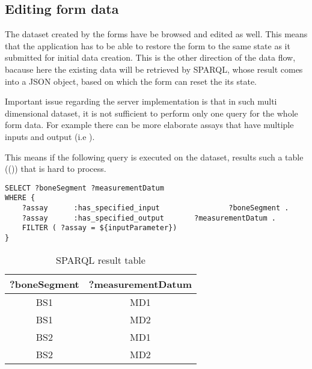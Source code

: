 \subsection{Editing form data}
	
	
The dataset created by the forms have be browsed and edited as well. This means that the application has to be able to restore the form to the same state as it submitted for initial data creation. This is the other direction of the data flow, bacause here the existing data will be retrieved by SPARQL, whose result comes into a JSON object, based on which the form can reset the its state.



Important issue regarding the server implementation is that in such multi dimensional dataset, it is not sufficient to perform only one query for the whole form data. For example there can be more elaborate assays that have multiple inputs and output (i.e ).



This means if the following query is executed on the dataset, results such a table (()) that is hard to process. 

\begin{lstlisting}[captionpos=b, caption=SPARQL query for the form data, label={sparqlExisting},
basicstyle=\footnotesize,frame=single]
SELECT ?boneSegment ?measurementDatum
WHERE {
	?assay		:has_specified_input				?boneSegment .
	?assay		:has_specified_output       ?measurementDatum .
	FILTER ( ?assay = ${inputParameter})
}
\end{lstlisting}


\begin{table}
	\begin{center}
		\begin{tabular}{||c | c||} 
			\hline
			?boneSegment & ?measurementDatum  \\ [0.5ex] 
			\hline\hline
			BS1 & MD1 \\ 
			\hline
			BS1 & MD2 \\ 
			\hline
			BS2 & MD1 \\ 
			\hline
			BS2 & MD2 \\  [1ex] 
			\hline 
		\end{tabular}
	\end{center}
	\caption{SPARQL result table}  \label{sparqlResult}
\end{table}

